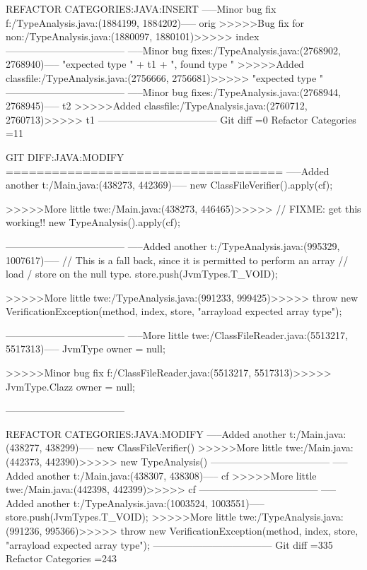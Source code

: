 REFACTOR CATEGORIES:JAVA:INSERT
-----Minor bug fix f:/TypeAnalysis.java:(1884199, 1884202)-----
orig
>>>>>Bug fix for non:/TypeAnalysis.java:(1880097, 1880101)>>>>>
index
------------------------------------
-----Minor bug fixes:/TypeAnalysis.java:(2768902, 2768940)-----
"expected type " + t1 + ", found type "
>>>>>Added classfile:/TypeAnalysis.java:(2756666, 2756681)>>>>>
"expected type "
------------------------------------
-----Minor bug fixes:/TypeAnalysis.java:(2768944, 2768945)-----
t2
>>>>>Added classfile:/TypeAnalysis.java:(2760712, 2760713)>>>>>
t1
------------------------------------
Git diff =0  Refactor Categories =11

GIT DIFF:JAVA:MODIFY
====================================
-----Added another t:/Main.java:(438273, 442369)-----
				new ClassFileVerifier().apply(cf);				
	
>>>>>More little twe:/Main.java:(438273, 446465)>>>>>
				// FIXME: get this working!!
				new TypeAnalysis().apply(cf);				
	
------------------------------------
-----Added another t:/TypeAnalysis.java:(995329, 1007617)-----
			// This is a fall back, since it is permitted to perform an array
			// load / store on the null type.
			store.push(JvmTypes.T_VOID);
	
>>>>>More little twe:/TypeAnalysis.java:(991233, 999425)>>>>>
			throw new VerificationException(method, index, store,
					"arrayload expected array type");
	
------------------------------------
-----More little twe:/ClassFileReader.java:(5513217, 5517313)-----
		JvmType owner = null;
	
>>>>>Minor bug fix f:/ClassFileReader.java:(5513217, 5517313)>>>>>
		JvmType.Clazz owner = null;
	
------------------------------------

REFACTOR CATEGORIES:JAVA:MODIFY
-----Added another t:/Main.java:(438277, 438299)-----
new ClassFileVerifier()
>>>>>More little twe:/Main.java:(442373, 442390)>>>>>
new TypeAnalysis()
------------------------------------
-----Added another t:/Main.java:(438307, 438308)-----
cf
>>>>>More little twe:/Main.java:(442398, 442399)>>>>>
cf
------------------------------------
-----Added another t:/TypeAnalysis.java:(1003524, 1003551)-----
store.push(JvmTypes.T_VOID);
>>>>>More little twe:/TypeAnalysis.java:(991236, 995366)>>>>>
throw new VerificationException(method, index, store,
					"arrayload expected array type");
------------------------------------
Git diff =335  Refactor Categories =243

